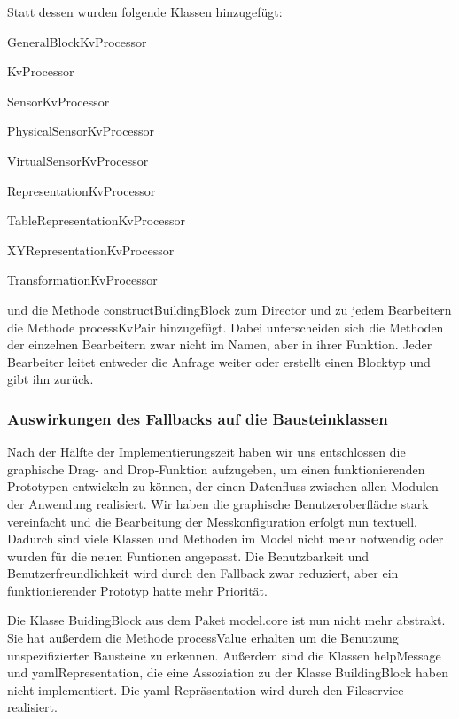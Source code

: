\documentclass[parskip=full]{scrartcl}
\begin{document}
Statt dessen wurden folgende Klassen hinzugefügt:
\begin{description}
\item{} GeneralBlockKvProcessor
\item{} KvProcessor
\item{} SensorKvProcessor
\item{} PhysicalSensorKvProcessor
\item{} VirtualSensorKvProcessor
\item{} RepresentationKvProcessor
\item{} TableRepresentationKvProcessor
\item{} XYRepresentationKvProcessor
\item{} TransformationKvProcessor
\end{description}

und die Methode constructBuildingBlock zum Director und zu jedem Bearbeitern die Methode processKvPair hinzugefügt. Dabei unterscheiden sich die Methoden der einzelnen Bearbeitern zwar nicht im Namen, aber in ihrer Funktion. Jeder Bearbeiter leitet entweder die Anfrage weiter oder erstellt einen Blocktyp und gibt ihn zurück. 

\subsubsection{Auswirkungen des Fallbacks auf die Bausteinklassen}
Nach der Hälfte der Implementierungszeit haben wir uns entschlossen die graphische Drag- and Drop-Funktion aufzugeben, um einen funktionierenden Prototypen entwickeln zu können, der einen Datenfluss zwischen allen Modulen der Anwendung realisiert. Wir haben die graphische Benutzeroberfläche stark vereinfacht und die Bearbeitung der Messkonfiguration erfolgt nun textuell. Dadurch sind viele Klassen und Methoden im Model nicht mehr notwendig oder wurden für die neuen Funtionen angepasst. Die Benutzbarkeit und Benutzerfreundlichkeit wird durch den Fallback zwar reduziert, aber ein funktionierender Prototyp hatte mehr Priorität.


Die Klasse BuidingBlock aus dem Paket model.core ist nun nicht mehr abstrakt. Sie hat außerdem die Methode processValue erhalten um die Benutzung unspezifizierter Bausteine zu erkennen. Außerdem sind die Klassen helpMessage und yamlRepresentation, die eine Assoziation zu der Klasse BuildingBlock haben nicht implementiert. Die yaml Repräsentation wird durch den Fileservice realisiert.
\end{document}
